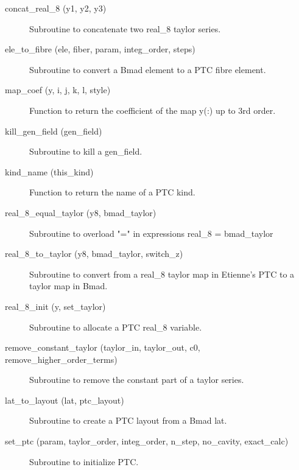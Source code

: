 \begin{description}

\label{r:concat.real.8}
\item[concat_real_8 (y1, y2, y3)] \Newline
Subroutine to concatenate two real_8 taylor series. 

\label{r:ele.to.fibre}
\item[ele_to_fibre (ele, fiber, param, integ_order, steps)] \Newline
Subroutine to convert a Bmad element to a PTC fibre element. 

\label{r:map.coef}
\item[map_coef (y, i, j, k, l, style)] \Newline
Function to return the coefficient of the map y(:) up to 3rd order. 

\label{r:kill.gen.field}
\item[kill_gen_field (gen_field)] \Newline
Subroutine to kill a gen_field. 

\label{r:kind.name}
\item[kind_name (this_kind)] \Newline
Function to return the name of a PTC kind. 

\label{r:real.8.equal.taylor}
\item[real_8_equal_taylor (y8, bmad_taylor)] \Newline
Subroutine to overload "=" in expressions real_8 = bmad_taylor 

\label{r:real.8.to.taylor}
\item[real_8_to_taylor (y8, bmad_taylor, switch_z)] \Newline
Subroutine to convert from a real_8 taylor map in Etienne's PTC to a taylor map in Bmad. 

\label{r:real.8.init}
\item[real_8_init (y, set_taylor)] \Newline
Subroutine to allocate a PTC real_8 variable. 

\label{r:remove.constant.taylor}
\item[remove_constant_taylor (taylor_in, taylor_out, c0, remove_higher_order_terms)] \Newline
Subroutine to remove the constant part of a taylor series. 

\label{r:lat.to.layout}
\item[lat_to_layout (lat, ptc_layout)] \Newline
Subroutine to create a PTC layout from a Bmad lat. 

\label{r:set.ptc}
\item[set_ptc (param, taylor_order, integ_order, n_step, no_cavity, exact_calc)] \Newline
Subroutine to initialize PTC. 


\end{description}

